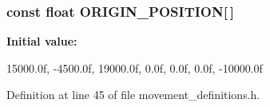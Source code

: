 \subsubsection[{\-O\-R\-I\-G\-I\-N\-\_\-\-P\-O\-S\-I\-T\-I\-O\-N}]{\setlength{\rightskip}{0pt plus 5cm}const float {\bf \-O\-R\-I\-G\-I\-N\-\_\-\-P\-O\-S\-I\-T\-I\-O\-N}[$\,$]}\label{movement__definitions_8h_a2ad0485bb435e29de38c196390aa2c8a}
{\bfseries \-Initial value\-:}
\begin{DoxyCode}
 {  15000.0f,
                                           -4500.0f,
                                           19000.0f,
                                               0.0f,
                                               0.0f,
                                               0.0f,
                                          -10000.0f }
\end{DoxyCode}


\-Definition at line 45 of file movement\-\_\-definitions.\-h.

